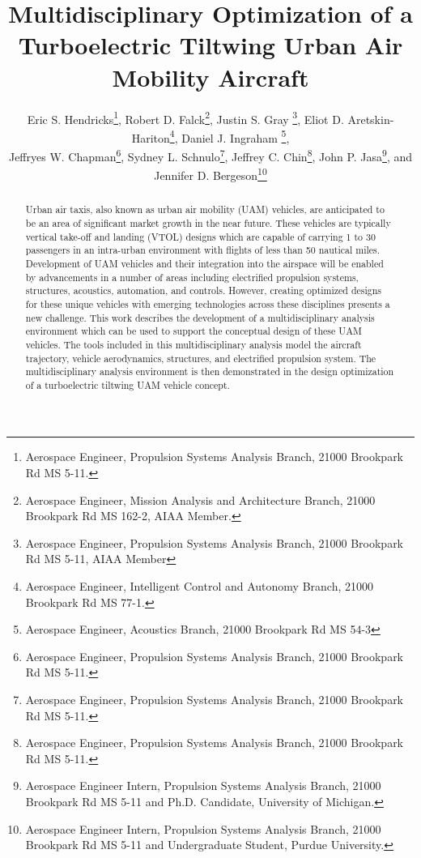 \documentclass[conf]{new-aiaa}
\title{Multidisciplinary Optimization of a Turboelectric Tiltwing Urban Air Mobility Aircraft}
\author{Eric S. Hendricks\footnote{Aerospace Engineer, Propulsion Systems Analysis Branch, 21000 Brookpark Rd MS 5-11.}, Robert D. Falck\footnote{Aerospace Engineer, Mission Analysis and Architecture Branch, 21000 Brookpark Rd MS 162-2, AIAA Member.}, Justin S. Gray \footnote{Aerospace Engineer, Propulsion Systems Analysis Branch, 21000 Brookpark Rd MS 5-11, AIAA Member}, Eliot D. Aretskin-Hariton\footnote{Aerospace Engineer, Intelligent Control and Autonomy Branch, 21000 Brookpark Rd MS 77-1.}, Daniel J. Ingraham \footnote{Aerospace Engineer, Acoustics Branch, 21000 Brookpark Rd MS 54-3}, \\ Jeffryes W. Chapman\footnote{Aerospace Engineer, Propulsion Systems Analysis Branch, 21000 Brookpark Rd MS 5-11.}, Sydney L. Schnulo\footnote{Aerospace Engineer, Propulsion Systems Analysis Branch, 21000 Brookpark Rd MS 5-11.}, Jeffrey C. Chin\footnote{Aerospace Engineer, Propulsion Systems Analysis Branch, 21000 Brookpark Rd MS 5-11.}, John P. Jasa\footnote{Aerospace Engineer Intern, Propulsion Systems Analysis Branch, 21000 Brookpark Rd MS 5-11 and Ph.D. Candidate, University of Michigan.}, and Jennifer D. Bergeson\footnote{Aerospace Engineer Intern, Propulsion Systems Analysis Branch, 21000 Brookpark Rd MS 5-11 and Undergraduate Student, Purdue University.}}
\affil{NASA Glenn Research Center, Cleveland, OH, 44135}
\begin{document}
\maketitle









% 



\begin{abstract}
Urban air taxis, also known as urban air mobility (UAM) vehicles, are anticipated to be an area of significant market growth in the near future.  
These vehicles are typically vertical take-off and landing (VTOL) designs which are capable of carrying 1 to 30 passengers in an intra-urban environment with flights of less than 50 nautical miles. 
Development of UAM vehicles and their integration into the airspace will be enabled by advancements in a number of areas including electrified propulsion systems, structures, acoustics, automation, and controls.
However, creating optimized designs for these unique vehicles with emerging technologies across these disciplines presents a new challenge.
This work describes the development of a multidisciplinary analysis environment which can be used to support the conceptual design of these UAM vehicles.
The tools included in this multidisciplinary analysis model the aircraft trajectory, vehicle aerodynamics, structures,  and electrified propulsion system.  
The multidisciplinary analysis environment is then demonstrated in the design optimization of a turboelectric tiltwing UAM vehicle concept. 
\end{abstract}

\end{document}
